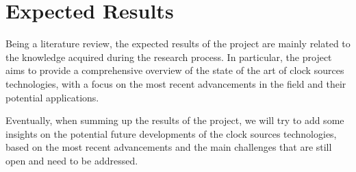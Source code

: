 \section{Expected Results}

Being a literature review, the expected results of the project are mainly related to the knowledge acquired during the research process.
In particular, the project aims to provide a comprehensive overview of the state of the art of clock sources technologies, with a focus on the most recent advancements in the field and their potential applications.

Eventually, when summing up the results of the project, we will try to add some insights on the potential future developments of the clock sources technologies, based on the most recent advancements and the main challenges that are still open and need to be addressed.

